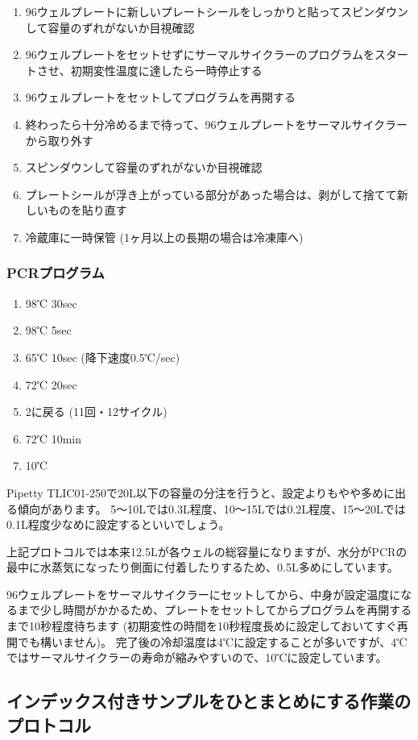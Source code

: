 \documentclass[titlepage,10pt,a4paper,uplatex]{jsbook}
\begin{document}
\begin{enumerate}
\item 96ウェルプレートに新しいプレートシールをしっかりと貼ってスピンダウンして容量のずれがないか目視確認
\item 96ウェルプレートをセットせずにサーマルサイクラーのプログラムをスタートさせ、初期変性温度に達したら一時停止する
\item 96ウェルプレートをセットしてプログラムを再開する
\item 終わったら十分冷めるまで待って、96ウェルプレートをサーマルサイクラーから取り外す
\item スピンダウンして容量のずれがないか目視確認
\item プレートシールが浮き上がっている部分があった場合は、剥がして捨てて新しいものを貼り直す
\item 冷蔵庫に一時保管 (1ヶ月以上の長期の場合は冷凍庫へ)
\end{enumerate}

\subsubsection{PCRプログラム}
\begin{enumerate}
\item 98℃ 30sec
\item 98℃ 5sec
\item 65℃ 10sec (降下速度0.5℃/sec)
\item 72℃ 20sec
\item 2に戻る (11回・12サイクル)
\item 72℃ 10min
\item 10℃
\end{enumerate}

Pipetty TLIC01-250で20{\textmu}L以下の容量の分注を行うと、設定よりもやや多めに出る傾向があります。
5～10{\textmu}Lでは0.3{\textmu}L程度、10～15{\textmu}Lでは0.2{\textmu}L程度、15～20{\textmu}Lでは0.1{\textmu}L程度少なめに設定するといいでしょう。

上記プロトコルでは本来12.5{\textmu}Lが各ウェルの総容量になりますが、水分がPCRの最中に水蒸気になったり側面に付着したりするため、0.5{\textmu}L多めにしています。

96ウェルプレートをサーマルサイクラーにセットしてから、中身が設定温度になるまで少し時間がかかるため、プレートをセットしてからプログラムを再開するまで10秒程度待ちます (初期変性の時間を10秒程度長めに設定しておいてすぐ再開でも構いません)。
完了後の冷却温度は4℃に設定することが多いですが、4℃ではサーマルサイクラーの寿命が縮みやすいので、10℃に設定しています。

\subsection{インデックス付きサンプルをひとまとめにする作業のプロトコル}
\end{document}
